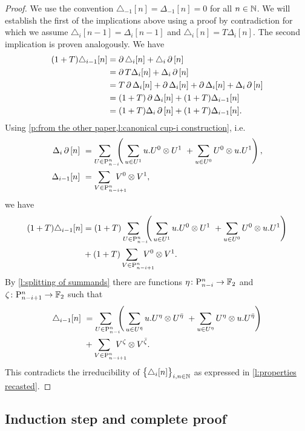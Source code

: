 \begin{proof}
	We use the convention $\triangle_{-1} [n] = \Delta_{-1} [n] = 0$ for all $n \in \mathbb{N}$.
	We will establish the first of the implications above using a proof by contradiction for which we assume $\triangle_i [n-1] = \Delta_i [n-1]$ and $\triangle_i [n] = T \Delta_i [n]$.
	The second implication is proven analogously.
	We have
	\begin{align*}
	(1+T) \triangle_{i-1}[n] &=
	\operatorname{\partial} \triangle_i [n] + \triangle_i \operatorname{\partial} \, [n] \\ &=
	\operatorname{\partial} T \Delta_i [n] + \Delta_i \operatorname{\partial} \, [n] \\ &=
	T \operatorname{\partial} \Delta_i [n] + \operatorname{\partial} \Delta_i [n] + \operatorname{\partial} \Delta_i [n] + \Delta_i \operatorname{\partial} \, [n] \\ &=
	(1+T) \operatorname{\partial} \Delta_i [n] + (1+T) \Delta_{i-1} [n] \\ &=
	(1+T) \Delta_i \operatorname{\partial} \, [n] + (1+T) \Delta_{i-1} [n].
	\end{align*}
	Using \cref{p:from the other paper,l:canonical cup-i construction}, i.e.
	\[
	\begin{split}
	\Delta_i \bd \, [n] \ &=
	\sum_{U \in \P_{n-i}^n \kern-5pt} \left( \,
	\sum_{u \in U^1} {u.U^0} \ot {U^1} \ +
	\sum_{u \in U^0} {U^0} \ot {u.U^1} \right), \\
	\Delta_{i-1} [n] \ &=
	\sum_{V \in \P_{n-i+1}^n \kern-15pt} V^0 \ot V^1,
	\end{split}
	\]
	we have
	\begin{align*}
	(1+T) \triangle_{i-1}[n] &=
	(1+T) \sum_{U \in \P_{n-i}^n \kern-5pt} \left( \,
	\sum_{u \in U^1} {u.U^0} \ot {U^1} \ +
	\sum_{u \in U^0} {U^0} \ot {u.U^1} \right) \\ &+
	(1+T) \sum_{V \in \P_{n-i+1}^n \kern-15pt} V^0 \ot V^1.
	\end{align*}
	By \cref{l:splitting of summands} there are functions $\eta \colon \mathrm{P}_{n-i}^n \to {\mathbb{F}_2}$ and $\zeta \colon \mathrm{P}_{n-i+1}^n \to {\mathbb{F}_2}$ such that
	\begin{align*}
	\triangle_{i-1}[n] \ &=
	\sum_{U \in \P_{n-i}^n \kern-5pt} \left( \,
	\sum_{u \in U^\bareta} u.U^\eta \ot U^\bareta \ +
	\sum_{u \in U^\eta} U^\eta \ot u.U^\bareta \right) \\ &+
	\sum_{V \in \P_{n-i+1}^n \kern-15pt} V^\zeta \ot V^\barzeta.
	\end{align*}
	This contradicts the irreducibility of $\big\{ \triangle_i [n] \big\}_{i,n\in\mathbb{N}}$ as expressed in \cref{l:properties recasted}.
\end{proof}

\subsection{Induction step and complete proof}

